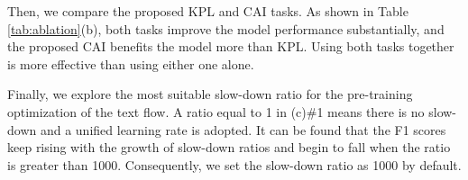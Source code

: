 \documentclass[11pt]{article}
\begin{document}
Then, we compare the proposed KPL and CAI tasks. As shown in Table \ref{tab:ablation}(b), both tasks improve the model performance substantially, and the proposed CAI benefits the model more than KPL. 
Using both tasks together is more effective than using either one alone.

Finally, we explore the most suitable slow-down ratio for the pre-training optimization of the text flow. 
A ratio equal to 1 in (c)\#1 means there is no slow-down and a unified learning rate is adopted.
It can be found that the F1 scores  keep rising with the growth of slow-down ratios and begin to fall when the ratio is greater than 1000. Consequently, we set the slow-down ratio as 1000 by default.



\begin{table}[!]
\centering
{}
\caption{Comparison on the semantic entity recognition (SER)  task of EPHOIE \cite{vies} dataset. ``ZH-R”  is short for  Chinese RoBERTa. $^1$\cite{blstmcrf};$^2$\cite{qian2019graphie};$^3$\cite{gcn};$^4$\cite{TRIE};$^5$\cite{vies};$^6$\cite{tang2021matchvie};$^7$\cite{tcpn};$^8$\cite{cui-etal-2020-revisiting}.}
\label{tab:ephoie}
\end{table}
\end{document}
